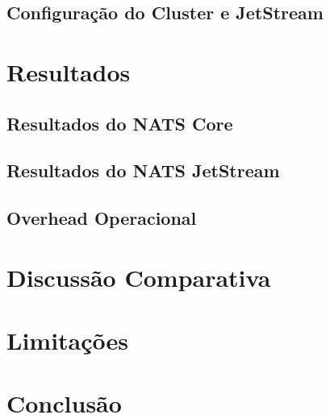 \documentclass[12pt]{article}
\begin{document}
\subsection{Configuração do Cluster e JetStream}
\label{sec:impl-jetstream}


\section{Resultados}
\label{sec:resultados}

\subsection{Resultados do NATS Core}
\label{sec:res-core}

\subsection{Resultados do NATS JetStream}
\label{sec:res-jetstream}

\subsection{Overhead Operacional}
\label{sec:res-overhead}


\section{Discussão Comparativa}
\label{sec:discussao}


\section{Limitações}
\label{sec:limitacoes}


\section{Conclusão}
\label{sec:conclusao}




\end{document}
